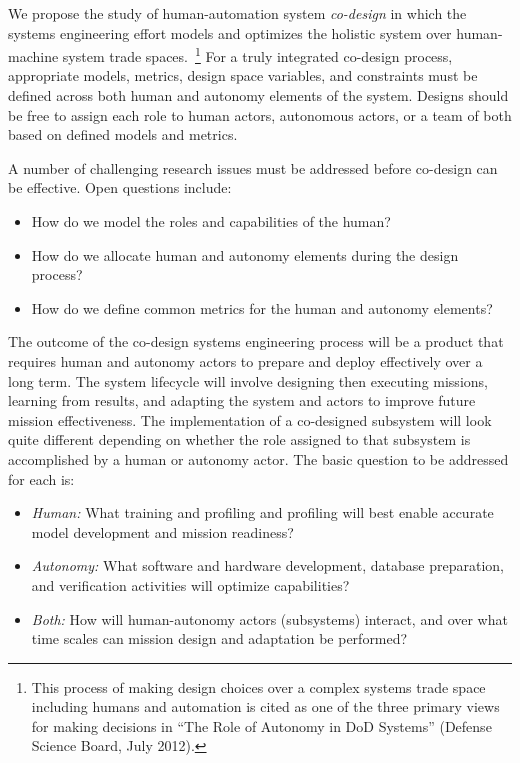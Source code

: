 We propose the study of human-automation system {\em co-design} in which the systems engineering 
effort models and optimizes the holistic system over human-machine system trade spaces.~\footnote{This 
process of making design choices over a complex systems trade space including humans and automation 
is cited as one of the three primary views for making decisions in ``The Role of Autonomy in DoD 
Systems'' (Defense Science Board, July 2012).}  For a truly integrated co-design process, 
appropriate models, metrics, design space variables, and constraints must be defined across
both human and autonomy elements of the system.  Designs should be free to assign each role to
human actors, autonomous actors, or a team of both based on defined models and metrics.  

A number of challenging research issues must be addressed before co-design can be effective.
Open questions include:
\begin{itemize}
\item How do we model the roles and capabilities of the human?
\item How do we allocate human and autonomy elements during the design process?
\item How do we define common metrics for the human and autonomy elements?
\end{itemize}

The outcome of the co-design systems engineering process will be a product that requires
human and autonomy actors to prepare and deploy effectively over a long term.  The system
lifecycle will involve designing then executing missions, learning from results, 
and adapting the system and actors to improve future mission effectiveness.  The implementation
of a co-designed subsystem will look quite different depending on whether the role assigned to
that subsystem is accomplished by a human or autonomy actor.  The basic question to be addressed for each is:

\begin{itemize}
\item {\em Human:} What training and profiling and profiling will best enable accurate 
model development and mission readiness?
\item {\em Autonomy:} What software and hardware development, database preparation, 
and verification activities will optimize capabilities?
\item {\em Both:} How will human-autonomy actors (subsystems) interact, and over what time
scales can mission design and adaptation be performed?
\end{itemize}

